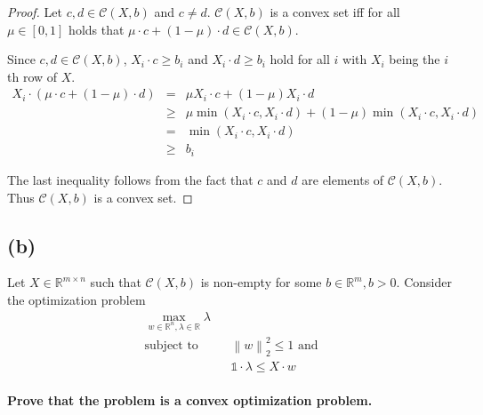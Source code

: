 \documentclass[a4paper, 11pt, titlepage]{article}
\newcommand{\norm}[1]{\left\lVert#1\right\rVert}
\begin{document}
\begin{proof}
	Let $c,d \in \mathcal{C}(X,b)$ and $c\not = d$.
	$\mathcal{C}(X,b)$ is a convex set iff for all $\mu \in [0,1]$ holds that $\mu\cdot c + (1-\mu)\cdot d \in \mathcal{C}(X,b)$.
	
	Since $c,d \in \mathcal{C}(X,b)$, $X_i\cdot c \ge b_i$ and $X_i\cdot d \ge b_i$ hold for all $i$ with $X_i$ being the $i$th row of $X$.
	\begin{eqnarray*}
		X_i \cdot (\mu \cdot c + (1-\mu)\cdot d) &=& \mu X_i \cdot c + (1-\mu) X_i \cdot d\\
		&\ge& \mu \min(X_i\cdot c,X_i\cdot d) + (1-\mu)\min(X_i\cdot c, X_i \cdot d)\\
		&=& \min(X_i\cdot c,X_i\cdot d)\\
		&\ge& b_i
	\end{eqnarray*}
	
	The last inequality follows from the fact that $c$ and $d$ are elements of $\mathcal{C}(X,b)$.
	Thus $\mathcal{C}(X,b)$ is a convex set.
\end{proof}

\subsection*{(b)}

Let $X\in\mathbb{R}^{m\times n}$ such that $\mathcal{C}(X,b)$ is non-empty for some $b\in\mathbb{R}^m,b>0$.
Consider the optimization problem
\begin{eqnarray*}
	\max_{w\in \mathbb{R}^n,\lambda \in \mathbb{R}} \lambda&&\\
	\text{subject to} && \norm{w}^2_2 \le 1 \text{ and}\\
	&& \mathds{1}\cdot \lambda \le X\cdot w
\end{eqnarray*}

\paragraph{Prove that the problem is a convex optimization problem.}
\end{document}
